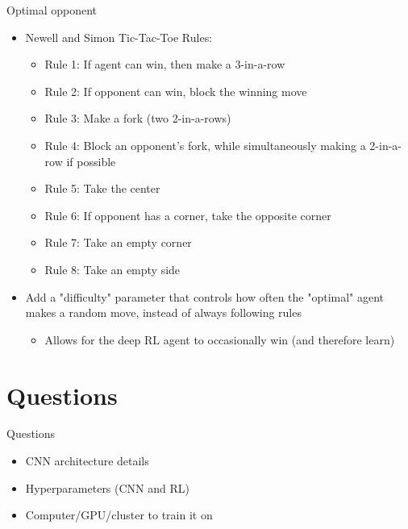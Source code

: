 \documentclass[11pt]{beamer}
\begin{document}
\begin{frame}{Optimal opponent}
	\begin{itemize}
		\item Newell and Simon Tic-Tac-Toe Rules:
		\begin{itemize}
			\item Rule 1: If agent can win, then make a 3-in-a-row
			\item Rule 2: If opponent can win, block the winning move
			\item Rule 3: Make a fork (two 2-in-a-rows)
			\item Rule 4: Block an opponent's fork, while simultaneously making a 2-in-a-row if possible
			\item Rule 5: Take the center
			\item Rule 6: If opponent has a corner, take the opposite corner
			\item Rule 7: Take an empty corner
			\item Rule 8: Take an empty side
		\end{itemize}		
		\item Add a "difficulty" parameter that controls how often the "optimal" agent makes a random move, instead of always following rules
		\begin{itemize}
			\item Allows for the deep RL agent to occasionally win (and therefore learn)
		\end{itemize}	
	\end{itemize}
\end{frame}

\section{Questions}
\begin{frame}{Questions}
	\begin{itemize}
		\item CNN architecture details
		\item Hyperparameters (CNN and RL)
		\item Computer/GPU/cluster to train it on
	\end{itemize}
\end{frame}
\end{document}
